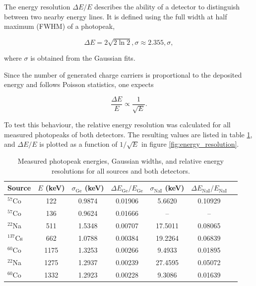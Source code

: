 The energy resolution $\Delta E / E$ describes the ability of a detector to distinguish between two nearby energy lines. It is defined using the full width at half maximum (FWHM) of a photopeak,

\begin{equation}
\Delta E = 2\sqrt{2\ln 2},\sigma \approx 2.355,\sigma ,
\end{equation}

where $\sigma$ is obtained from the Gaussian fits.

Since the number of generated charge carriers is proportional to the deposited energy and follows Poisson statistics, one expects

\begin{equation}
\frac{\Delta E}{E} \propto \frac{1}{\sqrt{E}} .
\end{equation}

To test this behaviour, the relative energy resolution was calculated for all measured photopeaks of both detectors. The resulting values are listed in table \ref{tab:energy_resolution}, and $\Delta E/E$ is plotted as a function of $1/\sqrt{E}$ in figure \ref{fig:energy_resolution}. 

\begin{table}[h!]
    \centering
    \caption{Measured photopeak energies, Gaussian widths, and relative energy resolutions for all sources and both detectors.}

    \begin{tabular}{l c c c c c c}
        \hline
        Source & $E$ (keV) & $\sigma_\text{Ge}$ (keV) & $\Delta E_\text{Ge}/E_\text{Ge}$ & $\sigma_\text{NaI}$ (keV) & $\Delta E_\text{NaI}/E_\text{NaI}$ \\
        \hline
        $^{57}$Co  & 122        & 0.9874         & 0.01906 & 5.6620     & 0.10929   \\
        $^{57}$Co  & 136        & 0.9624         & 0.01666 &    --      & --   \\
        $^{22}$Na  & 511        & 1.5348         & 0.00707 & 17.5011    &  0.08065   \\
        $^{137}$Cs & 662        & 1.0788         & 0.00384 & 19.2264    &  0.06839   \\
        $^{60}$Co  & 1175       & 1.3253         & 0.00266 &  9.4933    &  0.01895   \\
        $^{22}$Na  & 1275       & 1.2937         & 0.00239 & 27.4595    &  0.05072   \\
        $^{60}$Co  & 1332       & 1.2923         & 0.00228 &  9.3086    &  0.01639   \\
        \hline
    \end{tabular}
    \label{tab:energy_resolution}
\end{table}

